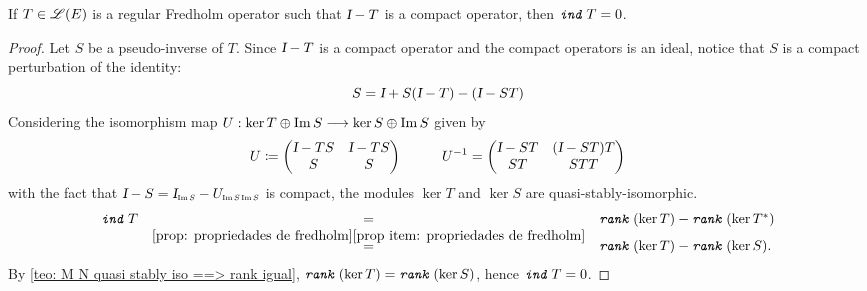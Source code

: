 \begin{proposicao}
    \label{prop: ind(I - K) = 0}
    If $T\in \mathscr L(E)$ is a regular Fredholm operator such that $\textsl{I} - T$ is a compact operator, then $\texttt{\textit{ind}}\, T = 0$.
    \begin{proof}
        Let $S$ be a pseudo-inverse of $T$. Since $\textsl{I} - T$ is a compact operator and the compact operators is an ideal, notice that $S$ is a compact perturbation of the identity:
        \begin{equation*}
            S = \textsl{I} + S(\textsl{I} - T) - (\textsl{I} - ST)
        \end{equation*}
        Considering the isomorphism map $U : \ker T\oplus \operatorname{Im} S \longrightarrow \ker S \oplus \operatorname{Im} S$ given by
        \begin{equation*}
            U \coloneqq \begin{pmatrix} \textsl{I} - TS  & \textsl{I} - TS \\ S  & S \end{pmatrix} \hspace{1cm} {U}^{-1} = \begin{pmatrix} \textsl{I} - ST & (\textsl{I} - ST)T \\ ST & STT \end{pmatrix}
        \end{equation*}
        with the fact that $\Id - S = \sub\Id{\Im S} - \sub{U}{\Im S\Im S}$ is compact, the modules $\ker T$ and $\ker S$ are quasi-stably-isomorphic. 
        \begin{equation*}
            \begin{array}{rcl}
                \texttt{\textit{ind}}\, T &=& \texttt{\textit{rank}}\,(\ker T) - \texttt{\textit{rank}}\,(\ker T^*) \\
                &\overset{\ref{prop: propriedades de fredholm}\ref{prop item: propriedades de fredholm}}=& \texttt{\textit{rank}}\,(\ker T) - \texttt{\textit{rank}}\,(\ker S).
            \end{array}
        \end{equation*}
        By \ref{teo: M N quasi stably iso ==> rank igual}, $\texttt{\textit{rank}}\,(\ker T) = \texttt{\textit{rank}}\,(\ker S)$, hence $\texttt{\textit{ind}}\, T = 0$.
    \end{proof}
\end{proposicao}

